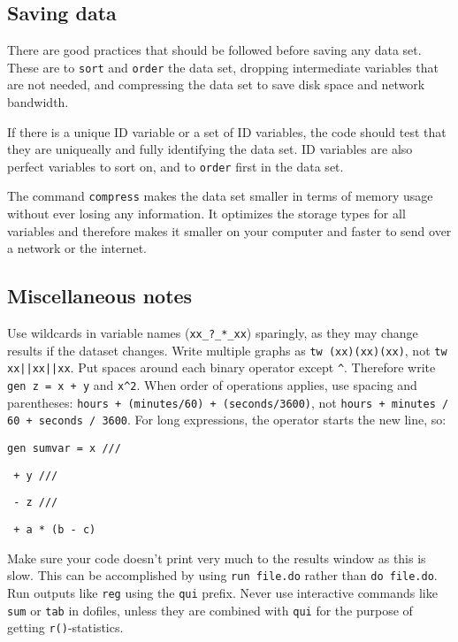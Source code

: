 
\subsection{Saving data}

There are good practices that should be followed before saving any data set.
These are to \texttt{sort} and \texttt{order} the data set,
dropping intermediate variables that are not needed,
and compressing the data set to save disk space and network bandwidth.

If there is a unique ID variable or a set of ID variables,
the code should test that they are uniqueally and
fully identifying the data set.
ID variables are also perfect variables to sort on,
and to \texttt{order} first in the data set.

The command \texttt{compress} makes the data set smaller in terms of memory usage
without ever losing any information.
It optimizes the storage types for all variables
and therefore makes it smaller on your computer
and faster to send over a network or the internet.


\subsection{Miscellaneous notes}

Use wildcards in variable names (\texttt{xx\_?\_*\_xx}) sparingly,
as they may change results if the dataset changes.
Write multiple graphs as \texttt{tw (xx)(xx)(xx)}, not \texttt{tw xx||xx||xx}.
Put spaces around each binary operator except \texttt{\^}.
Therefore write \texttt{gen z = x + y} and \texttt{x\^}\texttt{2}.
When order of operations applies, use spacing and parentheses:
\texttt{hours + (minutes/60) + (seconds/3600)}, not \texttt{hours + minutes / 60 + seconds / 3600}.
For long expressions, the operator starts the new line, so:

\texttt{gen sumvar =   x ///}

\texttt{             + y ///}

\texttt{             - z ///}

\texttt{             + a * (b - c)}

\noindent Make sure your code doesn't print very much to the results window as this is slow.
This can be accomplished by using \texttt{run file.do} rather than \texttt{do file.do}.
Run outputs like \texttt{reg} using the \texttt{qui} prefix.
Never use interactive commands like \texttt{sum} or \texttt{tab} in dofiles,
unless they are combined with \texttt{qui} for the purpose of getting \texttt{r()}-statistics.

\mainmatter

